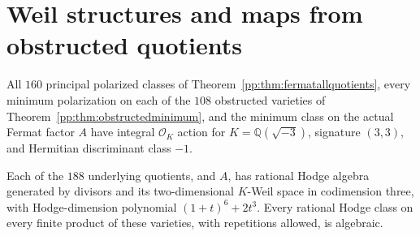 \section{Weil structures and maps from obstructed quotients}
\begin{corollary}
\label{pp:cor:quotientweilhodge}
All $160$ principal polarized classes of
Theorem~\ref{pp:thm:fermatallquotients}, every minimum polarization
on each of the $108$ obstructed varieties of
Theorem~\ref{pp:thm:obstructedminimum}, and the minimum class on the
actual Fermat factor $A$ have integral
$\mathcal O_K$ action for $K=\mathbb Q(\sqrt{-3})$, signature $(3,3)$,
and Hermitian discriminant class $-1$.

Each of the $188$ underlying quotients, and $A$, has rational Hodge
algebra generated by divisors and its two-dimensional $K$-Weil space
in codimension three, with Hodge-dimension polynomial
$(1+t)^6+2t^3$. Every rational Hodge class on every finite product of
these varieties, with repetitions allowed, is algebraic.
\end{corollary}
